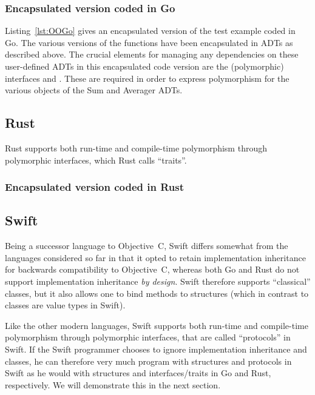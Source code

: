 \documentclass[11pt,oneside]{article}
\newcommand{\code}[1]{{\selectfont\ttfamily{#1}}}
\begin{document}
\subsubsection{Encapsulated version coded in Go}

Listing~\ref{lst:OOGo} gives an encapsulated version of the test
example coded in Go. The various versions of the \code{sum} functions
have been encapsulated in ADTs as described above. The crucial
elements for managing any dependencies on these user-defined ADTs in
this encapsulated code version are the (polymorphic) interfaces
\code{ISum} and \code{IAverager}. These are required in order to
express polymorphism for the various objects of the Sum and Averager
ADTs.




\subsection{Rust}

Rust supports both run-time and compile-time polymorphism through
polymorphic interfaces, which Rust calls ``traits''.

\subsubsection{Encapsulated version coded in Rust}



\subsection{Swift}

Being a successor language to Objective~C, Swift differs somewhat from
the languages considered so far in that it opted to retain
implementation inheritance for backwards compatibility to Objective~C,
whereas both Go and Rust do not support implementation inheritance
\emph{by design}. Swift therefore supports ``classical'' classes, but
it also allows one to bind methods to structures (which in contrast to
classes are value types in Swift).

Like the other modern languages, Swift supports both run-time and
compile-time polymorphism through polymorphic interfaces, that are
called ``protocols'' in Swift. If the Swift programmer chooses to
ignore implementation inheritance and classes, he can therefore very
much program with structures and protocols in Swift as he would with
structures and interfaces/traits in Go and Rust, respectively. We will
demonstrate this in the next section.
\end{document}
